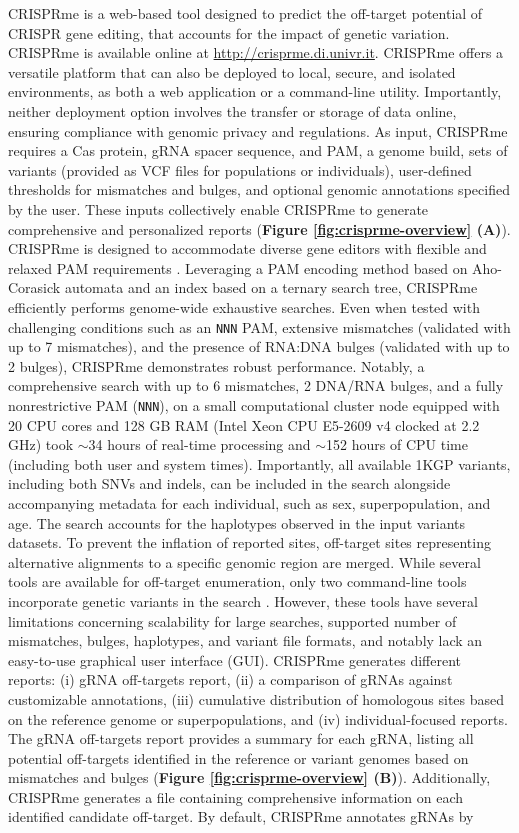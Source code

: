\documentclass[a4paper, titlepage, openright]{book}
\newcommand{\crisprme}{CRISPRme\xspace}
\begin{document}
\crisprme is a web-based tool designed to predict the off-target potential of CRISPR gene editing, that accounts for the impact of genetic variation. \crisprme is available online at \url{http://crisprme.di.univr.it}. \crisprme offers a versatile platform that can also be deployed to local, secure, and isolated environments, as both a web application or a command-line utility. Importantly, neither deployment option involves the transfer or storage of data online, ensuring compliance with genomic privacy and regulations. As input, \crisprme requires a Cas protein, gRNA spacer sequence, and PAM, a genome build, sets of variants (provided as VCF files for populations or individuals), user-defined thresholds for mismatches and bulges, and optional genomic annotations specified by the user. These inputs collectively enable \crisprme to generate comprehensive and personalized reports (\textbf{Figure \ref{fig:crisprme-overview} (A)}). \crisprme is designed to accommodate diverse gene editors with flexible and relaxed PAM requirements \citep{walton2020unconstrained}. Leveraging a PAM encoding method based on Aho-Corasick automata and an index based on a ternary search tree, \crisprme efficiently performs genome-wide exhaustive searches. Even when tested with challenging conditions such as an \texttt{NNN} PAM, extensive mismatches (validated with up to 7 mismatches), and the presence of RNA:DNA bulges (validated with up to 2 bulges), \crisprme demonstrates robust performance. Notably, a comprehensive search with up to 6 mismatches, 2 DNA/RNA bulges, and a fully nonrestrictive PAM (\texttt{NNN}), on a small computational cluster node equipped with 20 CPU cores and 128 GB RAM (Intel Xeon CPU E5-2609 v4 clocked at 2.2 GHz) took $\sim$34 hours of real-time processing and $\sim$152 hours of CPU time (including both user and system times). Importantly, all available 1KGP variants, including both SNVs and indels, can be included in the search alongside accompanying metadata for each individual, such as sex, superpopulation, and age. The search accounts for the haplotypes observed in the input variants datasets. To prevent the inflation of reported sites, off-target sites representing alternative alignments to a specific genomic region are merged.  While several tools are available for off-target enumeration, only two command-line tools incorporate genetic variants in the search \citep{lessard2017human,fennell2021calitas}. However, these tools have several limitations concerning scalability for large searches, supported number of mismatches, bulges, haplotypes, and variant file formats, and notably lack an easy-to-use graphical user interface (GUI). \crisprme generates different reports: (i) gRNA off-targets report, (ii) a comparison of gRNAs against customizable annotations, (iii) cumulative distribution of homologous sites based on the reference genome or superpopulations, and (iv) individual-focused reports. The gRNA off-targets report provides a summary for each gRNA, listing all potential off-targets identified in the reference or variant genomes based on mismatches and bulges (\textbf{Figure \ref{fig:crisprme-overview} (B)}). Additionally, \crisprme generates a file containing comprehensive information on each identified candidate off-target. By default, \crisprme annotates gRNAs by 
\end{document}
